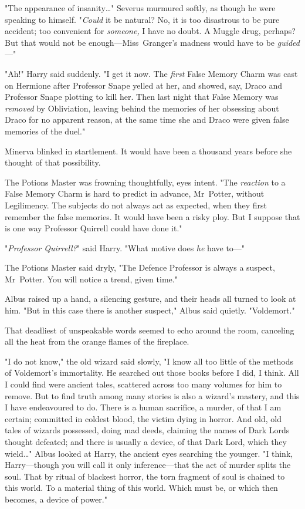 "The appearance of insanity…" Severus murmured softly, as though he were
speaking to himself. "\emph{Could} it be natural? No, it is too disastrous to
be pure accident; too convenient for \emph{someone,} I have no doubt. A Muggle
drug, perhaps? But that would not be enough—Miss~Granger's madness would have
to be \emph{guided}—"

"Ah!" Harry said suddenly. "I get it now. The \emph{first} False Memory Charm
was cast on Hermione after Professor Snape yelled at her, and showed, say,
Draco and Professor Snape plotting to kill her. Then last night that False
Memory was \emph{removed} by Obliviation, leaving behind the memories of her
obsessing about Draco for no apparent reason, at the same time she and Draco
were given false memories of the duel."

Minerva blinked in startlement. It would have been a thousand years before she
thought of that possibility.

The Potions Master was frowning thoughtfully, eyes intent. "The \emph{reaction}
to a False Memory Charm is hard to predict in advance, Mr~Potter, without
Legilimency. The subjects do not always act as expected, when they first
remember the false memories. It would have been a risky ploy. But I suppose
that is one way Professor Quirrell could have done it."

"\emph{Professor Quirrell?}" said Harry. "What motive does \emph{he} have to—"

The Potions Master said dryly, "The Defence Professor is always a suspect,
Mr~Potter. You will notice a trend, given time."

Albus raised up a hand, a silencing gesture, and their heads all turned to look
at him. "But in this case there is another suspect," Albus said quietly.
"Voldemort."

That deadliest of unspeakable words seemed to echo around the room, canceling
all the heat from the orange flames of the fireplace.

"I do not know," the old wizard said slowly, "I know all too little of the
methods of Voldemort's immortality. He searched out those books before I did, I
think. All I could find were ancient tales, scattered across too many volumes
for him to remove. But to find truth among many stories is also a wizard's
mastery, and this I have endeavoured to do. There is a human sacrifice, a
murder, of that I am certain; committed in coldest blood, the victim dying in
horror. And old, old tales of wizards possessed, doing mad deeds, claiming the
names of Dark Lords thought defeated; and there is usually a device, of that
Dark Lord, which they wield…" Albus looked at Harry, the ancient eyes
searching the younger. "I think, Harry—though you will call it only
inference—that the act of murder splits the soul. That by ritual of blackest
horror, the torn fragment of soul is chained to this world. To a material thing
of this world. Which must be, or which then becomes, a device of power."

